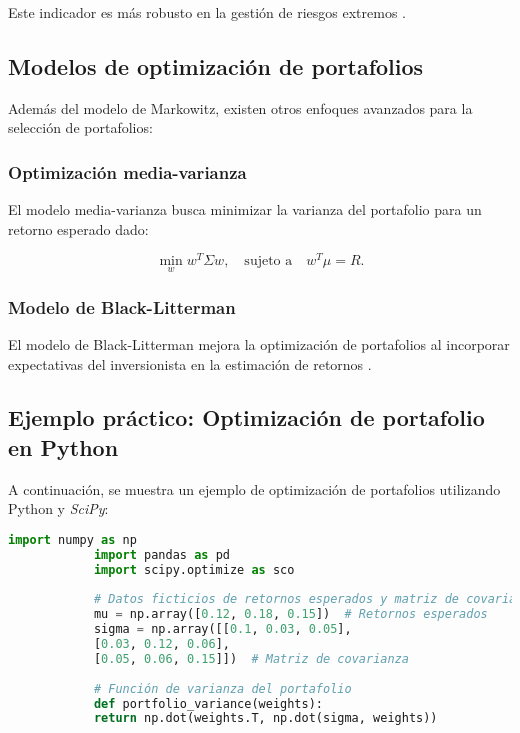 \begin{itemize}
		Este indicador es más robusto en la gestión de riesgos extremos \cite{rockafellar2000optimization}.
		
		\subsection{Modelos de optimización de portafolios}
		
		Además del modelo de Markowitz, existen otros enfoques avanzados para la selección de portafolios:
		
		\subsubsection{Optimización media-varianza}
		
		El modelo media-varianza busca minimizar la varianza del portafolio para un retorno esperado dado:
		
		\begin{equation}
			\min_w w^T \Sigma w, \quad \text{sujeto a} \quad w^T \mu = R.
		\end{equation}
		
		\subsubsection{Modelo de Black-Litterman}
		
		El modelo de Black-Litterman mejora la optimización de portafolios al incorporar expectativas del inversionista en la estimación de retornos \cite{black1992global}.
		
		\subsection{Ejemplo práctico: Optimización de portafolio en Python}
		
		A continuación, se muestra un ejemplo de optimización de portafolios utilizando Python y \textit{SciPy}:
		
		\begin{lstlisting}[language=Python, caption={Optimización de portafolios con SciPy}]
			import numpy as np
			import pandas as pd
			import scipy.optimize as sco
			
			# Datos ficticios de retornos esperados y matriz de covarianza
			mu = np.array([0.12, 0.18, 0.15])  # Retornos esperados
			sigma = np.array([[0.1, 0.03, 0.05],
			[0.03, 0.12, 0.06],
			[0.05, 0.06, 0.15]])  # Matriz de covarianza
			
			# Función de varianza del portafolio
			def portfolio_variance(weights):
			return np.dot(weights.T, np.dot(sigma, weights))
			

\end{lstlisting}
\end{itemize}
